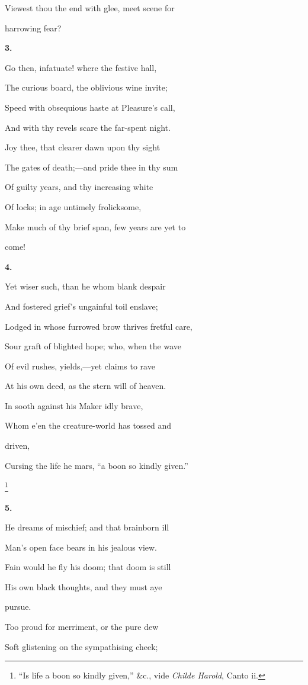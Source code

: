 Viewest thou the end with glee, meet scene for

harrowing fear?

\textbf{3.}

Go then, infatuate! where the festive hall,

The curious board, the oblivious wine
invite;

Speed with obsequious haste at Pleasure's call,

And with thy revels scare the far-spent
night.

Joy thee, that clearer dawn upon thy sight

The gates of death;—and pride thee in thy sum

Of guilty years, and thy increasing white

Of locks; in age untimely frolicksome,

Make much of thy brief span, few years are yet to

come!

\textbf{4.}

Yet wiser such, than he whom blank despair

And fostered grief's ungainful toil
enslave;

Lodged in whose furrowed brow thrives fretful care,

Sour graft of blighted hope; who, when the
wave

Of evil rushes, yields,—yet claims to
rave

At his own deed, as the stern will of heaven.

In sooth against his Maker idly brave,

Whom e'en the creature-world has tossed and

driven,

Cursing the life he mars, ``a boon so kindly
given.''

\footnote{``Is life a boon so kindly given,'' \&c., vide \emph{Childe Harold},
Canto ii.}

\textbf{5.}

He dreams of mischief; and that brainborn ill

Man's open face bears in his jealous view.

Fain would he fly his doom; that doom is still

His own black thoughts, and they must aye

pursue.

Too proud for merriment, or the pure dew

Soft glistening on the sympathising cheek;

